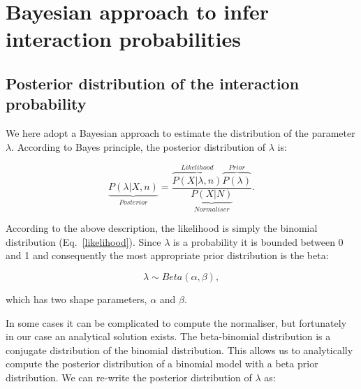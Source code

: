 \documentclass[12pt]{article}
\begin{document}



\section*{Bayesian approach to infer interaction probabilities}

    \subsection*{Posterior distribution of the interaction probability}


      We here adopt a Bayesian approach to estimate the distribution of the parameter $\lambda$. According to Bayes principle, the posterior distribution of $\lambda$ is:

      \begin{equation}
        \underbrace{P(\lambda|X,n)}_{Posterior} = \frac{\overbrace{P(X|\lambda,n)}^{Likelihood}\overbrace{P(\lambda)}^{Prior}}{\underbrace{P(X|N)}_{Normaliser}} .
        \label{posterior}
      \end{equation}

      According to the above description, the likelihood is simply the binomial distribution (Eq.~\ref{likelihood}). Since $\lambda$ is a probability it is bounded between 0 and 1 and consequently the most appropriate prior distribution is the beta:

      \begin{equation}
        \lambda \sim Beta(\alpha,\beta) , \label{prior}
      \end{equation}

      \noindent which has two shape parameters, $\alpha$ and $\beta$. 

     In some cases it can be complicated to compute the normaliser, but fortunately in our case an analytical solution exists. The beta-binomial distribution is a conjugate distribution of the binomial distribution. This allows us to analytically compute the posterior distribution of a binomial model with a beta prior distribution. We can re-write the posterior distribution of $\lambda$ as:
\end{document}
